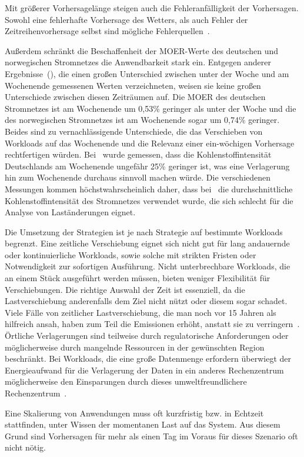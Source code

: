 Mit größerer Vorhersagelänge steigen auch die Fehleranfälligkeit der Vorhersagen.
Sowohl eine fehlerhafte Vorhersage des Wetters, als auch Fehler der Zeitreihenvorhersage selbst sind mögliche Fehlerquellen~\cite{Wiesner.2021}.

Außerdem schränkt die Beschaffenheit der \ac{MOER}-Werte des deutschen und norwegischen Stromnetzes die Anwendbarkeit stark ein.
Entgegen anderer Ergebnisse~(\cite{Wiesner.2021}), die einen großen Unterschied zwischen unter der Woche und am Wochenende gemessenen Werten verzeichneten, weisen sie keine großen Unterschiede zwischen diesen Zeiträumen auf.
Die \ac{MOER} des deutschen Stromnetzes ist am Wochenende um 0,53\% geringer als unter der Woche und die des norwegischen Stromnetzes ist am Wochenende sogar um 0,74\% geringer.
Beides sind zu vernachlässigende Unterschiede, die das Verschieben von Workloads auf das Wochenende und die Relevanz einer ein-wöchigen Vorhersage rechtfertigen würden.
Bei~\cite{Wiesner.2021} wurde gemessen, dass die Kohlenstoffintensität Deutschlands am Wochenende ungefähr 25\% geringer ist, was eine Verlagerung hin zum Wochenende durchaus sinnvoll machen würde.
Die verschiedenen Messungen kommen höchstwahrscheinlich daher, dass bei~\cite{Wiesner.2021} die durchschnittliche Kohlenstoffintensität des Stromnetzes verwendet wurde, die sich schlecht für die Analyse von Laständerungen eignet.

Die Umsetzung der Strategien ist je nach Strategie auf bestimmte Workloads begrenzt.
Eine zeitliche Verschiebung eignet sich nicht gut für lang andauernde oder kontinuierliche Workloads, sowie solche mit strikten Fristen oder Notwendigkeit zur sofortigen Ausführung.
Nicht unterbrechbare Workloads, die an einem Stück ausgeführt werden müssen, bieten weniger Flexibilität für Verschiebungen.
Die richtige Auswahl der Zeit ist essenziell, da die Lastverschiebung anderenfalls dem Ziel nicht nützt oder diesem sogar schadet.
Viele Fälle von zeitlicher Lastverschiebung, die man noch vor 15 Jahren als hilfreich ansah, haben zum Teil die Emissionen erhöht, anstatt sie zu verringern~\cite{WattTime.12.3.2024}.
Örtliche Verlagerungen sind teilweise durch regulatorische Anforderungen oder möglicherweise durch mangelnde Ressourcen in der gewünschten Region beschränkt.
Bei Workloads, die eine große Datenmenge erfordern überwiegt der Energieaufwand für die Verlagerung der Daten in ein anderes Rechenzentrum möglicherweise den Einsparungen durch dieses umweltfreundlichere Rechenzentrum~\cite{Norlander.2023}.

Eine Skalierung von Anwendungen muss oft kurzfristig bzw. in Echtzeit stattfinden, unter Wissen der momentanen Last auf das System.
Aus diesem Grund sind Vorhersagen für mehr als einen Tag im Voraus für dieses Szenario oft nicht nötig.

